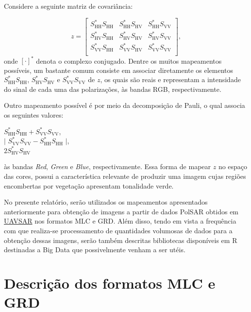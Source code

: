 \documentclass[12pt]{article}
\begin{document}
Considere a seguinte matriz de covariância:

\[
z = 
\begin{bmatrix}
	S_{\text{HH}}^{\text{*}}S_{\text{HH}} & S_{\text{HH}}^{\text{*}}S_{\text{HV}} & S_{\text{HH}}^{\text{*}}S_{\text{VV}}\\
    S_{\text{HV}}^{\text{*}}S_{\text{HH}} & S_{\text{HV}}^{\text{*}}S_{\text{HV}} & S_{\text{HV}}^{\text{*}}S_{\text{VV}}\\
    S_{\text{VV}}^{\text{*}}S_{\text{HH}} & S_{\text{VV}}^{\text{*}}S_{\text{HV}} & S_{\text{VV}}^{\text{*}}S_{\text{VV}}\\
\end{bmatrix},
\]
onde $[\cdot]^{\text{*}}$ denota o complexo conjugado. Dentre os muitos mapeamentos possíveis, um bastante comum consiste em associar diretamente os elementos $S_{\text{HH}}^{\text{*}}S_{\text{HH}}$, $S_{\text{HV}}^{\text{*}}S_{\text{HV}}$ e $S_{\text{VV}}^{\text{*}}S_{\text{VV}}$ de $z$, os quais são reais e representam a intensidade do sinal de cada uma das polarizações\cite{Frery15}, às bandas RGB, respectivamente.

Outro mapeamento possível é por meio da decomposição de Pauli, o qual associa os seguintes valores:
\begin{center}
$S_{\text{HH}}^{\text{*}}S_{\text{HH}} + S_{\text{VV}}^{\text{*}}S_{\text{VV}}$, \\
$|$ $S_{\text{VV}}^{\text{*}}S_{\text{VV}} - S_{\text{HH}}^{\text{*}}S_{\text{HH}}$ $|$, \\
$2S_{\text{HV}}^{\text{*}}S_{\text{HV}}$ \\

\end{center}
às bandas \textit{Red}, \textit{Green} e \textit{Blue}, respectivamente. Essa forma de mapear $z$ no espaço das cores, possui a característica relevante de produzir uma imagem cujas regiões encombertas por vegetação apresentam tonalidade verde.

No presente relatório, serão utilizados os mapeamentos apresentados anteriormente para obtenção de imagens a partir de dados PolSAR obtidos em \href{https://uavsar.jpl.nasa.gov}{UAVSAR} nos formatos MLC e GRD. Além disso, tendo em vista a frequência com que realiza-se processamento de quantidades volumosas de dados para a obtenção dessas imagens, serão também descritas bibliotecas disponíveis em R destinadas a Big Data que possivelmente venham a ser utéis.

\section{Descrição dos formatos MLC e GRD}
\end{document}
